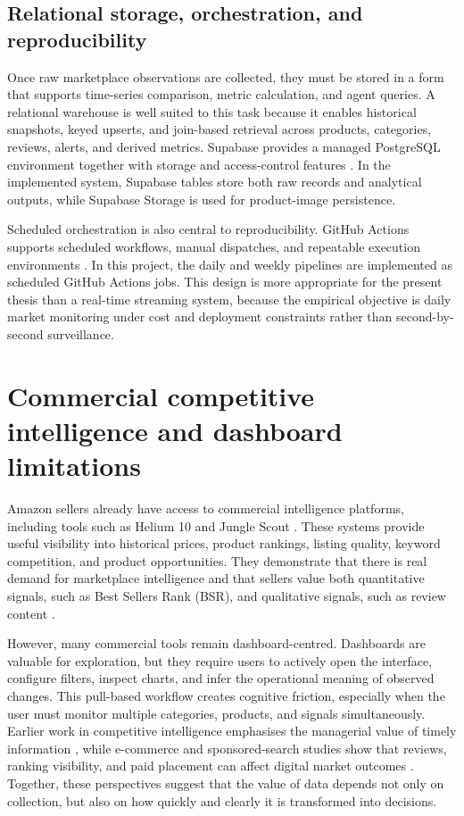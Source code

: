 \subsection{Relational storage, orchestration, and reproducibility}

Once raw marketplace observations are collected, they must be stored in
a form that supports time-series comparison, metric calculation, and
agent queries. A relational warehouse is well suited to this task because
it enables historical snapshots, keyed upserts, and join-based retrieval
across products, categories, reviews, alerts, and derived metrics.
Supabase provides a managed PostgreSQL environment together with storage
and access-control features \citep{supabase2024docs}. In the implemented
system, Supabase tables store both raw records and analytical outputs,
while Supabase Storage is used for product-image persistence.

Scheduled orchestration is also central to reproducibility. GitHub
Actions supports scheduled workflows, manual dispatches, and repeatable
execution environments \citep{githubactions2024}. In this project, the
daily and weekly pipelines are implemented as scheduled GitHub Actions
jobs. This design is more appropriate for the present thesis than a
real-time streaming system, because the empirical objective is daily
market monitoring under cost and deployment constraints rather than
second-by-second surveillance.

\section{Commercial competitive intelligence and dashboard limitations}

Amazon sellers already have access to commercial intelligence platforms,
including tools such as Helium 10 and Jungle Scout
\citep{helium10listing, junglescout2024}. These systems provide useful
visibility into historical prices, product rankings, listing quality,
keyword competition, and product opportunities. They demonstrate that
there is real demand for marketplace intelligence and that sellers value
both quantitative signals, such as Best Sellers Rank (BSR), and
qualitative signals, such as review content \citep{amazon2024bsr,
chevalier2006, mudambi2010helpful}.

However, many commercial tools remain dashboard-centred. Dashboards are
valuable for exploration, but they require users to actively open the
interface, configure filters, inspect charts, and infer the operational
meaning of observed changes. This pull-based workflow creates cognitive
friction, especially when the user must monitor multiple categories,
products, and signals simultaneously. Earlier work in competitive
intelligence emphasises the managerial value of timely information
\citep{gilad1985}, while e-commerce and sponsored-search studies show
that reviews, ranking visibility, and paid placement can affect digital
market outcomes \citep{chevalier2006, ghose2009, mudambi2010helpful}.
Together, these perspectives suggest that the value of data depends not
only on collection, but also on how quickly and clearly it is transformed
into decisions.

